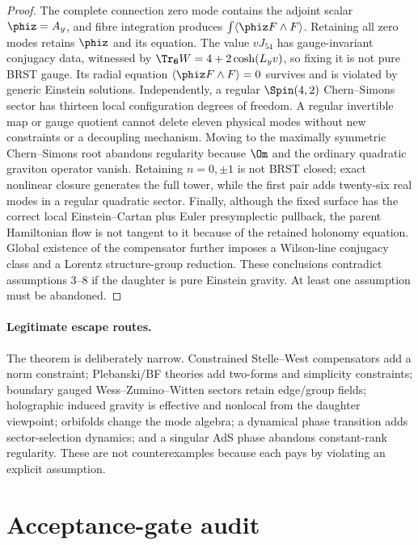 \begin{proof}
The complete connection zero mode contains the adjoint scalar $\phiz=A_y$, and fibre integration produces $\int\langle\phiz F\wedge F\rangle$.  Retaining all zero modes retains $\phiz$ and its equation.  The value $vJ_{54}$ has gauge-invariant conjugacy data, witnessed by $\Tr_{\mathbf6}W=4+2\cosh(L_yv)$, so fixing it is not pure BRST gauge.  Its radial equation $\langle\phiz F\wedge F\rangle=0$ survives and is violated by generic Einstein solutions.  Independently, a regular $\Spin(4,2)$ Chern--Simons sector has thirteen local configuration degrees of freedom.  A regular invertible map or gauge quotient cannot delete eleven physical modes without new constraints or a decoupling mechanism.  Moving to the maximally symmetric Chern--Simons root abandons regularity because $\Om$ and the ordinary quadratic graviton operator vanish.  Retaining $n=0,\pm1$ is not BRST closed; exact nonlinear closure generates the full tower, while the first pair adds twenty-six real modes in a regular quadratic sector.  Finally, although the fixed surface has the correct local Einstein--Cartan plus Euler presymplectic pullback, the parent Hamiltonian flow is not tangent to it because of the retained holonomy equation.  Global existence of the compensator further imposes a Wilson-line conjugacy class and a Lorentz structure-group reduction.  These conclusions contradict assumptions 3--8 if the daughter is pure Einstein gravity.  At least one assumption must be abandoned.
\end{proof}

\paragraph{Legitimate escape routes.}
The theorem is deliberately narrow.  Constrained Stelle--West compensators add a norm constraint; Plebanski/BF theories add two-forms and simplicity constraints; boundary gauged Wess--Zumino--Witten sectors retain edge/group fields; holographic induced gravity is effective and nonlocal from the daughter viewpoint; orbifolds change the mode algebra; a dynamical phase transition adds sector-selection dynamics; and a singular AdS phase abandons constant-rank regularity.  These are not counterexamples because each pays by violating an explicit assumption.

\section{Acceptance-gate audit}
\label{sec:gates}

